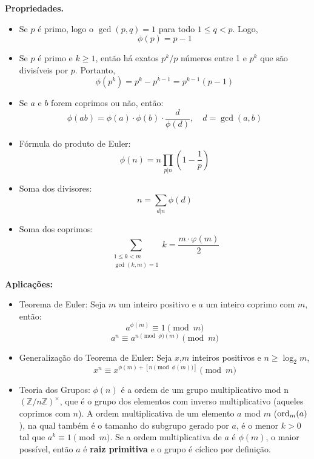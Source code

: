 \textbf{Propriedades.}
\begin{multicols}{2}
    \begin{itemize}
        \item Se $p$ é primo, logo o $\gcd(p,q) = 1$ para todo $1\leq q < p$. Logo,
        $$\phi(p) = p-1$$
        \item Se $p$ é primo e $k \ge 1$, então há exatos $p^k/p$ números entre 1 e $p^k$ que são divisíveis por $p$. Portanto,
        $$\phi(p^k) = p^k - p^{k-1} = p^{k-1}(p-1)$$
        \item Se $a$ e $b$ forem coprimos ou não, então:
        $$\phi(ab)=\phi(a)\cdot \phi(b) \cdot \frac{d}{\phi(d)},\quad d = \gcd(a,b)$$
        \item Fórmula do produto de Euler:
        $$\phi(n)=n\prod_{p|n}(1-\frac{1}{p})$$
        \item Soma dos divisores:
        $$n = \sum_{d|n}\phi(d)$$
        \item Soma dos coprimos:
        $$\sum_{\substack{1 \leq k < m \\ \gcd(k, m) = 1}} k = \frac{m \cdot \varphi(m)}{2}$$

    \end{itemize}
    
\end{multicols}

\textbf{Aplicações:}
\begin{itemize}
    \item Teorema de Euler: Seja $m$ um inteiro positivo e $a$ um inteiro coprimo com $m$, então:
    $$a^{\phi(m)} \equiv 1 \pmod m$$
    $$a^n \equiv a^{n \pmod \phi(m)} \pmod m$$
    
    \item Generalização do Teorema de Euler: Seja $x$,$m$ inteiros positivos e $n \ge \log_2m$,
    $$x^n \equiv x^{\phi(m)+[n \pmod{\phi(m)}]} \pmod m$$
    
    \item Teoria dos Grupos: $\phi(n)$ é a ordem de um grupo multiplicativo mod n $(\mathbb{Z}/n\mathbb{Z})^{\times}$, que é o grupo dos elementos com inverso multiplicativo (aqueles coprimos com $n$). A ordem multiplicativa de um elemento $a$ mod $m$ ($\textnormal{ord}_m(a)$), na qual também é o tamanho do subgrupo gerado por $a$, é o menor $k > 0$ tal que $a^k \equiv 1 \pmod m$. Se a ordem multiplicativa de $a$ é $\phi(m)$, o maior possível, então $a$ é \textbf{raiz primitiva} e o grupo é cíclico por definição.
    
\end{itemize}

